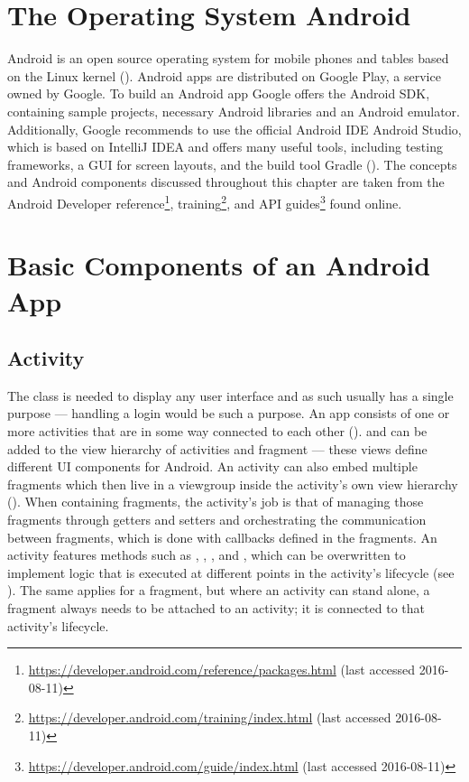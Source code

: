 \section{The Operating System Android}
Android is an open source operating system for mobile phones and tables based on the Linux kernel (\cite{androiddef}). Android apps are distributed on Google Play, a service owned by Google. To build an Android app Google offers the Android \gls{SDK}, containing sample projects, necessary Android libraries and an Android emulator. Additionally, Google recommends to use the official Android \gls{IDE} Android Studio, which is based on IntelliJ IDEA and offers many useful tools, including testing frameworks, a \gls{GUI} for screen layouts, and the build tool Gradle (\cite{androidstudio}). The concepts and Android components discussed throughout this chapter are taken from the Android Developer reference\footnote{\url{https://developer.android.com/reference/packages.html} (last accessed 2016-08-11)}, training\footnote{\url{https://developer.android.com/training/index.html} (last accessed 2016-08-11)}, and \gls{API} guides\footnote{\url{https://developer.android.com/guide/index.html} (last accessed 2016-08-11)} found online.

\section{Basic Components of an Android App}

\subsection{Activity}
The  class is needed to display any user interface and as such usually has a single purpose --- handling a login would be such a purpose. An app consists of one or more activities that are in some way connected to each other (\cite{activities_in_app}).  and  can be added to the view hierarchy of activities and fragment --- these views define different UI components for Android. An activity can also embed multiple fragments which then live in a viewgroup inside the activity's own view hierarchy (\cite{androidfragment}). When containing fragments, the activity’s job is that of managing those fragments through getters and setters and orchestrating the communication between fragments, which is done with callbacks defined in the fragments. 
An activity features methods such as , , , and , which can be overwritten to implement logic that is executed at different points in the activity's lifecycle (see ). The same applies for a fragment, but where an activity can stand alone, a fragment always needs to be attached to an activity; it is connected to that activity's lifecycle.

